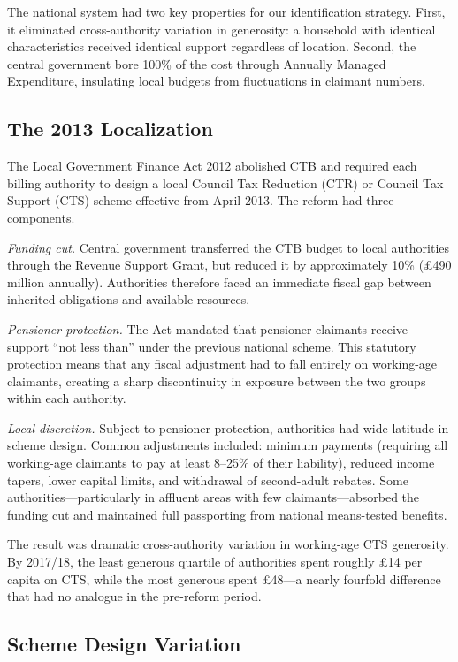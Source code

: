 \documentclass[12pt]{article}
\begin{document}
The national system had two key properties for our identification strategy. First, it eliminated cross-authority variation in generosity: a household with identical characteristics received identical support regardless of location. Second, the central government bore 100\% of the cost through Annually Managed Expenditure, insulating local budgets from fluctuations in claimant numbers.

\subsection{The 2013 Localization}

The Local Government Finance Act 2012 abolished CTB and required each billing authority to design a local Council Tax Reduction (CTR) or Council Tax Support (CTS) scheme effective from April 2013. The reform had three components.

\textit{Funding cut.} Central government transferred the CTB budget to local authorities through the Revenue Support Grant, but reduced it by approximately 10\% (\pounds490 million annually). Authorities therefore faced an immediate fiscal gap between inherited obligations and available resources.

\textit{Pensioner protection.} The Act mandated that pensioner claimants receive support ``not less than'' under the previous national scheme. This statutory protection means that any fiscal adjustment had to fall entirely on working-age claimants, creating a sharp discontinuity in exposure between the two groups within each authority.

\textit{Local discretion.} Subject to pensioner protection, authorities had wide latitude in scheme design. Common adjustments included: minimum payments (requiring all working-age claimants to pay at least 8--25\% of their liability), reduced income tapers, lower capital limits, and withdrawal of second-adult rebates. Some authorities---particularly in affluent areas with few claimants---absorbed the funding cut and maintained full passporting from national means-tested benefits.

The result was dramatic cross-authority variation in working-age CTS generosity. By 2017/18, the least generous quartile of authorities spent roughly \pounds14 per capita on CTS, while the most generous spent \pounds48---a nearly fourfold difference that had no analogue in the pre-reform period.

\subsection{Scheme Design Variation}
\end{document}
